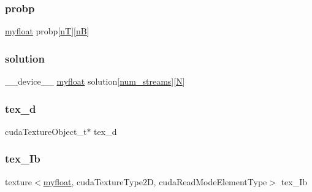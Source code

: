 \subsubsection{\texorpdfstring{probp}{probp}}
{\footnotesize\ttfamily \hyperlink{param_8h_a5f097c9f3873af7be7fc156e6a06ca5e}{myfloat} probp\mbox{[}\hyperlink{NarrowBand_8h_a11e43991170d325cb21737c8e7d5acaa}{nT}\mbox{]}\mbox{[}\hyperlink{NarrowBand_8h_aca13f491975ccaa9a165708a85753bda}{nB}\mbox{]}}

\mbox{\label{mc__gpu_8cu_afcb028a3164fe9ad50b60635222ffd5b}} 
\subsubsection{\texorpdfstring{solution}{solution}}
{\footnotesize\ttfamily \+\_\+\+\_\+device\+\_\+\+\_\+ \hyperlink{param_8h_a5f097c9f3873af7be7fc156e6a06ca5e}{myfloat} solution\mbox{[}\hyperlink{param_8h_ad38ac11e843c3ad8714da6e5599cd1fb}{num\+\_\+streams}\mbox{]}\mbox{[}\hyperlink{mc__gpu_8cu_ab2b6b0c222cd1ce70d6a831f57241e59}{N}\mbox{]}}

\mbox{\label{mc__gpu_8cu_ad5c4d0a58301ccacad07ee3641a693b8}} 
\subsubsection{\texorpdfstring{tex\+\_\+d}{tex\_d}}
{\footnotesize\ttfamily cuda\+Texture\+Object\+\_\+t$\ast$ tex\+\_\+d}

\mbox{\label{mc__gpu_8cu_a9845843f86869d1ea8e08ed0458cd0f0}} 
\subsubsection{\texorpdfstring{tex\+\_\+\+Ib}{tex\_Ib}}
{\footnotesize\ttfamily texture$<$\hyperlink{param_8h_a5f097c9f3873af7be7fc156e6a06ca5e}{myfloat}, cuda\+Texture\+Type2D, cuda\+Read\+Mode\+Element\+Type$>$ tex\+\_\+\+Ib}

\mbox{\label{mc__gpu_8cu_af5760f0df5d9e1fdc7eb6c8ff7ef978d}} 
